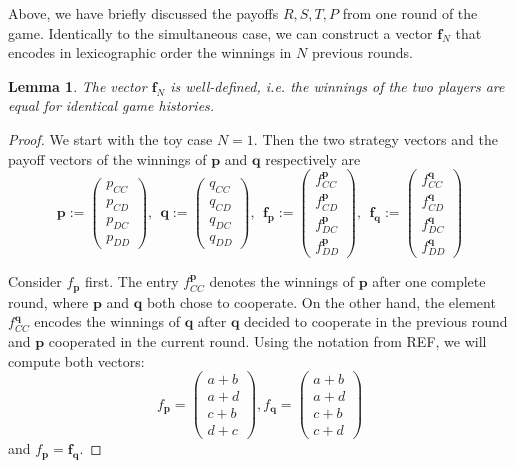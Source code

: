 \documentclass{article}
\def\p{\mathbf{p}}
\def\q{\mathbf{q}}
\def\f{\mathbf{f}}
\newtheorem{lemma}[theorem]{Lemma}
\theoremstyle{definition}
\numberwithin{equation}{section}
\begin{document}
Above, we have briefly discussed the payoffs $R,S,T,P$ from one round of the game. Identically to the simultaneous case, we can construct a vector $\f_N$ that encodes in lexicographic order the winnings in $N$ previous rounds. 
\begin{lemma}
\label{st: payoff vector correctly defined}
    The vector $\f_N$ is well-defined, i.e. the winnings of the two players are equal for identical game histories. 
\end{lemma}
\begin{proof}
    We start with the toy case $N=1$. Then the two strategy vectors and the payoff vectors of the winnings of $\p$ and $\q$ respectively  are
    \[
    \p:=\begin{pmatrix}
        p_{CC}\\
        p_{CD}\\
        p_{DC}\\
        p_{DD}
    \end{pmatrix}, \ \ \q:=\begin{pmatrix}
        q_{CC}\\
        q_{CD}\\
        q_{DC}\\
        q_{DD}
    \end{pmatrix}, \ \ \f_{\p}:=\begin{pmatrix}
        f_{CC}^{\p}\\
        f_{CD}^{\p}\\
        f_{DC}^{\p}\\
        f_{DD}^{\p}
    \end{pmatrix}, \ \ \f_{\q}:=\begin{pmatrix}
        f_{CC}^{\q}\\
        f_{CD}^{\q}\\
        f_{DC}^{\q}\\
        f_{DD}^{\q}
    \end{pmatrix}
    \]

    Consider $f_{\p}$ first. The entry $f_{CC}^{\p}$ denotes the winnings of $\p$ after one complete round, where $\p$ and $\q$ both chose to cooperate. On the other hand, the element $f^{\q}_{CC}$ encodes the winnings of $\q$ after $\q$ decided to cooperate in the previous round and $\p$ cooperated in the current round. Using the notation from REF, we will compute both vectors:
    \[
    f_{\p} =\begin{pmatrix}
        a + b\\
        a + d\\
        c + b\\
        d + c
    \end{pmatrix},    f_{\q} =\begin{pmatrix}
      a + b\\
       a + d\\
       c+b\\
       c+d
    \end{pmatrix}
    \] 
    and $f_{\p} = \f_{\q}$. 


\end{proof}
\end{document}
